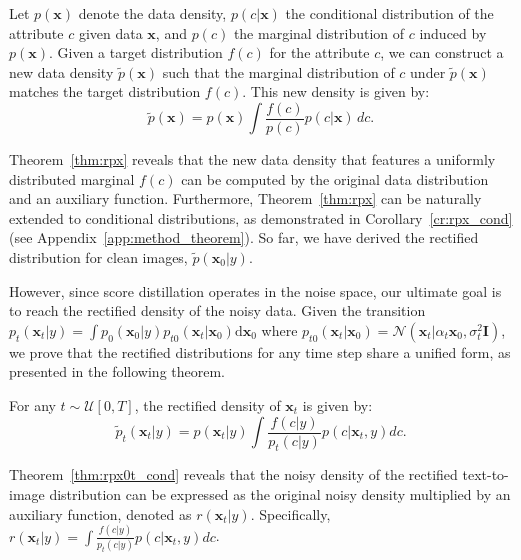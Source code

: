 \begin{theorem}\label{thm:rpx}
 Let $p(\boldsymbol{x})$ denote the data density, $p(c | \boldsymbol{x})$ the conditional distribution of the attribute $c$ given data $\boldsymbol{x}$, and $p(c)$ the marginal distribution of $c$ induced by $p(\boldsymbol{x})$. Given a target distribution $f(c)$ for the attribute $c$, we can construct a new data density $\tilde{p}(\boldsymbol{x})$ such that the marginal distribution of $c$ under $\tilde{p}(\boldsymbol{x})$ matches the target distribution $f(c)$. This new density is given by:
    \begin{equation}
 \tilde{p}(\boldsymbol{x}) = p(\boldsymbol{x}) \int \frac{f(c)}{p(c)} p(c | \boldsymbol{x}) \, dc.
    \end{equation}
\end{theorem}

Theorem~\ref{thm:rpx} reveals that the new data density that features a uniformly distributed marginal $f(c)$ can be computed by the original data distribution and an auxiliary function. Furthermore, Theorem~\ref{thm:rpx} can be naturally extended to conditional distributions, as demonstrated in Corollary~\ref{cr:rpx_cond} (see Appendix~\ref{app:method_theorem}). So far, we have derived the rectified distribution for clean images, $\tilde{p}(\boldsymbol{x}_0|y)$.

However, since score distillation operates in the noise space, our ultimate goal is to reach the rectified density of the noisy data. Given the transition $p_t(\boldsymbol{x}_t|y) = \int p_0(\boldsymbol{x}_0|y)p_{t0}(\boldsymbol{x}_t|\boldsymbol{x}_0)\mathrm{d}\boldsymbol{x}_0$ where $p_{t0}(\boldsymbol{x}_t|\boldsymbol{x}_0)=\mathcal{N}(\boldsymbol{x}_t|\alpha_t\boldsymbol{x}_0,\sigma_t^2\boldsymbol{I})$, we prove that the rectified distributions for any time step share a unified form, as presented in the following theorem.


\begin{theorem}\label{thm:rpx0t_cond}
 For any $t \sim \mathcal{U}[0, T]$, the rectified density of $\boldsymbol{x}_t$ is given by:
    \begin{equation}\label{eq:rpx0t_cond}
 \tilde{p}_t(\boldsymbol{x}_t|y) = p(\boldsymbol{x}_t|y) \int \frac{f(c|y)}{p_t(c|y)} p(c | \boldsymbol{x}_t, y) dc.
    \end{equation}
\end{theorem}
Theorem~\ref{thm:rpx0t_cond} reveals that the noisy density of the rectified text-to-image distribution can be expressed as the original noisy density multiplied by an auxiliary function, denoted as $r(\boldsymbol{x}_t|y)$. Specifically, $r(\boldsymbol{x}_t|y) = \int \frac{f(c|y)}{p_t(c|y)} p(c | \boldsymbol{x}_t, y) dc$.

